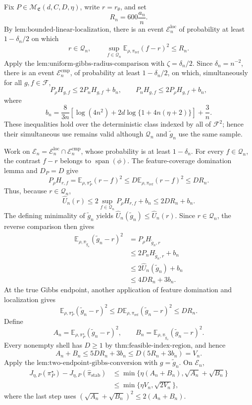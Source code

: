 Fix \(P\in\mathcal M_{\mathfrak E}(d,C,D,\eta)\), write \(r=r_\theta\), and set
\[
R_n=600\frac{a_n}{n}.
\]
By \(\text{lem:bounded-linear-localization}\), there is an event \(\mathcal E_n^{\mathrm{loc}}\) of probability at least \(1-\delta_n/2\) on which
\[
r\in\mathcal Q_n,
\qquad
\sup_{f\in\mathcal Q_n}\mathbb E_{\rho,\pi_{\mathrm{ref}}}(f-r)^2\le R_n.
\]
Apply the \(\text{lem:uniform-gibbs-radius-comparison}\) with \(\zeta=\delta_n/2\). Since \(\delta_n=n^{-2}\), there is an event \(\mathcal E_n^{\mathrm{cmp}}\), of probability at least \(1-\delta_n/2\), on which, simultaneously for all \(g,f\in\mathcal F\),
\[
P_\rho H_{g,f}\le2P_nH_{g,f}+b_n,
\qquad
P_nH_{g,f}\le2P_\rho H_{g,f}+b_n,
\]
where
\[
b_n=\frac{8}{3n}\left[\log(4n^2)+2d\log\{1+4n(\eta+2)\}\right]+\frac3n.
\]
These inequalities hold over the deterministic class indexed by all of \(\mathcal F^2\); hence their simultaneous use remains valid although \(\mathcal Q_n\) and \(\widetilde g_n\) use the same sample.

Work on \(\mathcal E_n=\mathcal E_n^{\mathrm{loc}}\cap\mathcal E_n^{\mathrm{cmp}}\), whose probability is at least \(1-\delta_n\). For every \(f\in\mathcal Q_n\), the contrast \(f-r\) belongs to \(\operatorname{span}(\phi)\). The feature-coverage domination lemma and \(D_P=D\) give
\[
P_\rho H_{r,f}
=\mathbb E_{\rho,\pi_P^\star}(r-f)^2
\le D\mathbb E_{\rho,\pi_{\mathrm{ref}}}(r-f)^2
\le DR_n.
\]
Thus, because \(r\in\mathcal Q_n\),
\[
\widehat U_n(r)
\le2\sup_{f\in\mathcal Q_n}P_\rho H_{r,f}+b_n
\le2DR_n+b_n.
\]
The defining minimality of \(\widetilde g_n\) yields \(\widehat U_n(\widetilde g_n)\le\widehat U_n(r)\). Since \(r\in\mathcal Q_n\), the reverse comparison then gives
\[
\begin{aligned}
\mathbb E_{\rho,\pi_{\widetilde g_n}}(\widetilde g_n-r)^2
&=P_\rho H_{\widetilde g_n,r}\\
&\le2P_nH_{\widetilde g_n,r}+b_n\\
&\le2\widehat U_n(\widetilde g_n)+b_n\\
&\le4DR_n+3b_n.
\end{aligned}
\]
At the true Gibbs endpoint, another application of feature domination and localization gives
\[
\mathbb E_{\rho,\pi_P^\star}(\widetilde g_n-r)^2
\le D\mathbb E_{\rho,\pi_{\mathrm{ref}}}(\widetilde g_n-r)^2
\le DR_n.
\]
Define
\[
A_n=\mathbb E_{\rho,\pi_P^\star}(\widetilde g_n-r)^2,
\qquad
B_n=\mathbb E_{\rho,\pi_{\widetilde g_n}}(\widetilde g_n-r)^2.
\]
Every nonempty shell has \(D\ge1\) by \(\text{thm:feasible-index-region}\), and hence
\[
A_n+B_n\le5DR_n+3b_n
\le D(5R_n+3b_n)=V_n.
\]
Apply the \(\text{lem:two-endpoint-gibbs-conversion}\) with \(g=\widetilde g_n\). On \(\mathcal E_n\),
\[
\begin{aligned}
J_{\eta,P}(\pi_P^\star)-J_{\eta,P}(\widehat\pi_{\mathrm{stab}})
&\le\min\{\eta(A_n+B_n),\sqrt{A_n}+\sqrt{B_n}\}\\
&\le\min\{\eta V_n,\sqrt{2V_n}\},
\end{aligned}
\]
where the last step uses \((\sqrt{A_n}+\sqrt{B_n})^2\le2(A_n+B_n)\).

